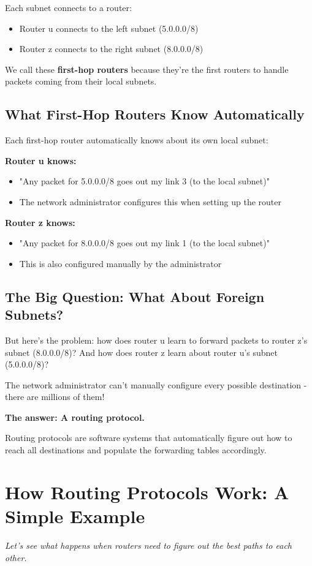 \documentclass[../../compsys.tex]{subfiles}
\begin{document}
Each subnet connects to a router:
\begin{itemize}
    \item Router u connects to the left subnet (5.0.0.0/8)
    \item Router z connects to the right subnet (8.0.0.0/8)
\end{itemize}

We call these \textbf{first-hop routers} because they're the first routers to handle packets coming from their local subnets.

\subsection{What First-Hop Routers Know Automatically}
Each first-hop router automatically knows about its own local subnet:

\textbf{Router u knows:}
\begin{itemize}
    \item "Any packet for 5.0.0.0/8 goes out my link 3 (to the local subnet)"
    \item The network administrator configures this when setting up the router
\end{itemize}

\textbf{Router z knows:}
\begin{itemize}
    \item "Any packet for 8.0.0.0/8 goes out my link 1 (to the local subnet)"
    \item This is also configured manually by the administrator
\end{itemize}

\subsection{The Big Question: What About Foreign Subnets?}
But here's the problem: how does router u learn to forward packets to router z's subnet (8.0.0.0/8)? And how does router z learn about router u's subnet (5.0.0.0/8)?

The network administrator can't manually configure every possible destination - there are millions of them!

\textbf{The answer: A routing protocol.}

Routing protocols are software systems that automatically figure out how to reach all destinations and populate the forwarding tables accordingly.

\section{How Routing Protocols Work: A Simple Example}
\textit{Let's see what happens when routers need to figure out the best paths to each other.}
\end{document}
